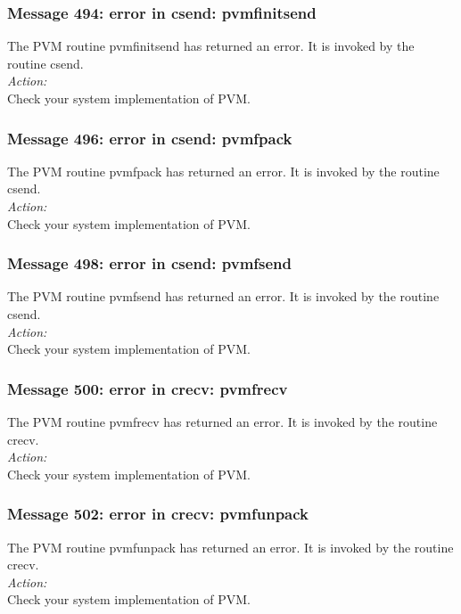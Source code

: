 \subsubsection*{Message 494: error in csend: pvmfinitsend}
The PVM routine {\sc pvmfinitsend} has returned an error. It is invoked by the
routine {\sc csend}.
\\

\noindent
{\em Action:}\\ 
Check your system implementation of PVM.

\subsubsection*{Message 496: error in csend: pvmfpack}
The PVM routine {\sc pvmfpack} has returned an error. It is invoked by the
routine {\sc csend}.
\\

\noindent
{\em Action:}\\ 
Check your system implementation of PVM.

\subsubsection*{Message 498: error in csend: pvmfsend}
The PVM routine {\sc pvmfsend} has returned an error. It is invoked by the
routine {\sc csend}.
\\

\noindent
{\em Action:}\\ 
Check your system implementation of PVM.

\subsubsection*{Message 500: error in crecv: pvmfrecv}
The PVM routine {\sc pvmfrecv} has returned an error. It is invoked by the
routine {\sc crecv}.
\\

\noindent
{\em Action:}\\ 
Check your system implementation of PVM.

\subsubsection*{Message 502: error in crecv: pvmfunpack}
The PVM routine {\sc pvmfunpack} has returned an error. It is invoked by the
routine {\sc crecv}.
\\

\noindent
{\em Action:}\\ 
Check your system implementation of PVM.

